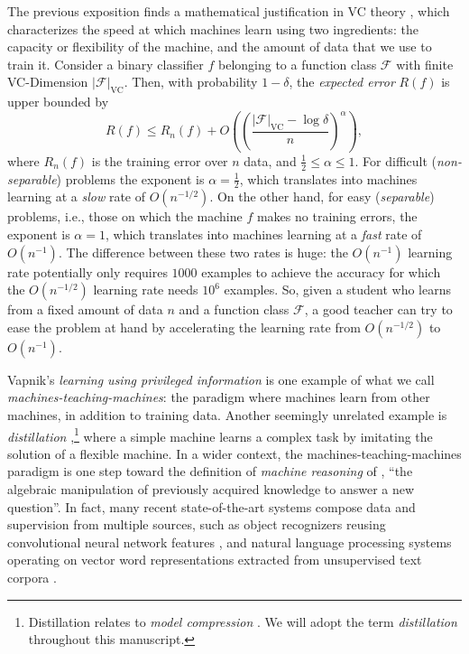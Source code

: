 \documentclass{article}
\begin{document}
The previous exposition finds a mathematical justification in VC theory
\citep{Vapnik98}, which characterizes the speed at which machines learn using
two ingredients: the capacity or flexibility of the machine, and the amount of
data that we use to train it. Consider a binary classifier $f$ belonging to a
function class $\mathcal{F}$ with finite VC-Dimension
$|\mathcal{F}|_\textrm{VC}$. Then, with probability $1-\delta$, the
\emph{expected error} $R(f)$ is upper bounded by
\begin{equation}
  R(f) \leq R_n(f) + O\left(\left(\frac{|\mathcal{F}|_{\textrm{VC}}-\log
  \delta}{n}\right)^{\alpha}\right),
\end{equation}
where $R_n(f)$ is the training error over $n$ data, and $\frac{1}{2} \leq
\alpha \leq 1$.  For difficult (\emph{non-separable}) problems the exponent is
$\alpha = \frac{1}{2}$, which translates into machines learning at a
\emph{slow} rate of $O(n^{-1/2})$.  On the other hand, for easy
(\emph{separable}) problems, i.e., those on which the machine $f$ makes 
no training errors, the exponent is $\alpha = 1$, which translates into machines
learning at a \emph{fast} rate of $O(n^{-1})$.  The difference between these
two rates is huge: the $O(n^{-1})$ learning rate potentially only requires
$1000$ examples to achieve the accuracy for which the $O(n^{-1/2})$ learning
rate needs $10^6$ examples.  So, given a student who learns from a fixed amount
of data $n$ and a function class $\mathcal{F}$, a good teacher can try to ease
the problem at hand by accelerating the learning rate from $O(n^{-1/2})$ to
$O(n^{-1})$.

Vapnik's \emph{learning using privileged information} is one example of what
we call \emph{machines-teaching-machines}: the paradigm where machines learn
from other machines, in addition to training data. Another seemingly unrelated
example is \emph{distillation} \citep{Hinton15},\footnote{Distillation 
relates to \emph{model compression} \citep{Burges97,Bucilua06,Ba14}. We will
adopt the term \emph{distillation} throughout this manuscript.} where a simple
machine learns a complex task by imitating the solution of a flexible machine.
%
In a wider context, the machines-teaching-machines paradigm is one step toward
the definition of \emph{machine reasoning} of \citet{bottou2014machine},
``the algebraic manipulation of previously acquired knowledge to
answer a new question''. In fact, many recent state-of-the-art systems compose
data and supervision from multiple sources, such as object recognizers reusing
convolutional neural network features \citep{oquab2014learning}, and natural
language processing systems operating on vector word representations extracted
from unsupervised text corpora \citep{mikolov2013efficient}.
\end{document}
